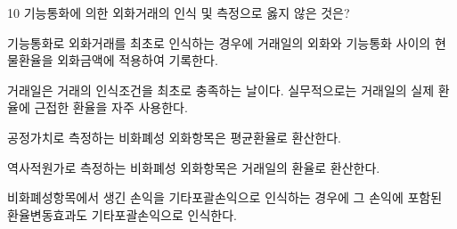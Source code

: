 \begin{question}{10}
기능통화에 의한 외화거래의 인식 및 측정으로 옳지 않은 것은?
\begin{choices}
  \item 기능통화로 외화거래를 최초로 인식하는 경우에 거래일의 외화와 기능통화 사이의 현물환율을 외화금액에 적용하여 기록한다.
  \item 거래일은 거래의 인식조건을 최초로 충족하는 날이다. 실무적으로는 거래일의 실제 환율에 근접한 환율을 자주 사용한다.
  \item 공정가치로 측정하는 비화폐성 외화항목은 평균환율로 환산한다.
  \item 역사적원가로 측정하는 비화폐성 외화항목은 거래일의 환율로 환산한다.
  \item 비화폐성항목에서 생긴 손익을 기타포괄손익으로 인식하는 경우에 그 손익에 포함된 환율변동효과도 기타포괄손익으로 인식한다.
\end{choices}
\end{question}
